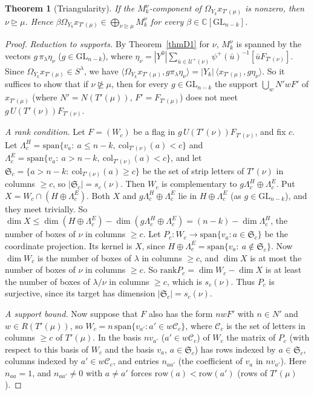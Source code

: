 \documentclass[11pt, letterpaper]{amsart}
\newtheorem{theorem}{Theorem}
\theoremstyle{definition}
\theoremstyle{remark}
\newcommand{\CC}{\mathbb{C}}
\newcommand{\GL}{\mathrm{GL}}
\newcommand{\row}{\mathrm{row}}
\newcommand{\col}{\mathrm{col}}
\newcommand{\rank}{\mathrm{rank}}
\begin{document}
\begin{theorem}[Triangularity]\label{thmT}
If the $M_k^{\nu}$-component of $\Omega_{Y_k}x_{T'(\mu)}$ is nonzero, then $\nu\trianglerighteq\mu$. Hence $\beta \Omega_{Y_k}x_{T'(\mu)}\in\bigoplus_{\nu\trianglerighteq\mu}M_k^{\nu}$ for every $\beta\in\CC[\GL_{n-k}]$.
\end{theorem}
\begin{proof}
\emph{Reduction to supports.} By Theorem~\ref{thmD1} for $\nu$, $M_k^{\nu}$ is spanned by the vectors $g\,\pi_\lambda \eta_\nu$ ($g\in\GL_{n-k}$), where $\eta_\nu=|Y^0|\sum_{\bar u\in\mathcal U^+(\nu)}\psi^+(\bar u)^{-1}[\bar uF_{T'(\nu)}]$. Since $\Omega_{Y_k}x_{T'(\mu)}\in S^\lambda$, we have $\langle \Omega_{Y_k}x_{T'(\mu)},g\pi_\lambda \eta_\nu\rangle=|Y_k|\,\langle x_{T'(\mu)},g\eta_\nu\rangle$. So it suffices to show that if $\nu\not\trianglerighteq\mu$, then for every $g\in\GL_{n-k}$ the support $\bigcup_wN'wF'$ of $x_{T'(\mu)}$ (where $N'=N(T'(\mu))$, $F'=F_{T'(\mu)}$) does not meet $g\,U(T'(\nu))F_{T'(\nu)}$.

\emph{A rank condition.} Let $F=(W_c)$ be a flag in $g\,U(T'(\nu))F_{T'(\nu)}$, and fix $c$. Let $\Lambda^H_c=\mathrm{span}\{v_a:\ a\le n-k,\ \col_{T'(\nu)}(a)<c\}$ and $\Lambda^E_c=\mathrm{span}\{v_a:\ a>n-k,\ \col_{T'(\nu)}(a)<c\}$, and let $\mathfrak S_c=\{a>n-k:\ \col_{T'(\nu)}(a)\ge c\}$ be the set of strip letters of $T'(\nu)$ in columns $\ge c$, so $|\mathfrak S_c|=s_c(\nu)$. Then $W_c$ is complementary to $g\Lambda^H_c\oplus\Lambda^E_c$. Put $X=W_c\cap(H\oplus\Lambda^E_c)$. Both $X$ and $g\Lambda^H_c\oplus\Lambda^E_c$ lie in $H\oplus\Lambda^E_c$ (as $g\in\GL_{n-k}$), and they meet trivially. So $\dim X\le\dim(H\oplus\Lambda^E_c)-\dim(g\Lambda^H_c\oplus\Lambda^E_c)=(n-k)-\dim\Lambda^H_c$, the number of boxes of $\nu$ in columns $\ge c$. Let $P_c\colon W_c\to\mathrm{span}\{v_a:a\in\mathfrak S_c\}$ be the coordinate projection. Its kernel is $X$, since $H\oplus\Lambda^E_c=\mathrm{span}\{v_a:\ a\notin\mathfrak S_c\}$. Now $\dim W_c$ is the number of boxes of $\lambda$ in columns $\ge c$, and $\dim X$ is at most the number of boxes of $\nu$ in columns $\ge c$. So $\rank P_c=\dim W_c-\dim X$ is at least the number of boxes of $\lambda/\nu$ in columns $\ge c$, which is $s_c(\nu)$. Thus $P_c$ is surjective, since its target has dimension $|\mathfrak S_c|=s_c(\nu)$.

\emph{A support bound.} Now suppose that $F$ also has the form $nwF'$ with $n\in N'$ and $w\in R(T'(\mu))$, so $W_c=n\,\mathrm{span}\{v_{a'}:a'\in w\mathcal C_c\}$, where $\mathcal C_c$ is the set of letters in columns $\ge c$ of $T'(\mu)$. In the basis $nv_{a'}$ ($a'\in w\mathcal C_c$) of $W_c$ the matrix of $P_c$ (with respect to this basis of $W_c$ and the basis $v_a$, $a\in\mathfrak S_c$) has rows indexed by $a\in\mathfrak S_c$, columns indexed by $a'\in w\mathcal C_c$, and entries $n_{aa'}$ (the coefficient of $v_a$ in $nv_{a'}$). Here $n_{aa}=1$, and $n_{aa'}\ne0$ with $a\ne a'$ forces $\row(a)<\row(a')$ (rows of $T'(\mu)$).


\end{proof}
\end{document}
